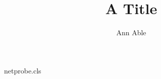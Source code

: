 \begin{filecontents*}[overwrite]{netprobe.cls}
\RequirePackage[latin1]{inputenc}
\def\@anames{}\def\@xa{}
\renewcommand\author[1]{\gdef\@anames{#1}}
\newcommand\xa[1]{\gdef\@xa{Universit^^e9 de Gen^^e8ve: #1}}
\renewcommand\@author{\@anames\\\@xa}
\end{filecontents*}
\documentclass{netprobe}

\title{A Title}
\author{Ann Able}
\maketitle
Text.

